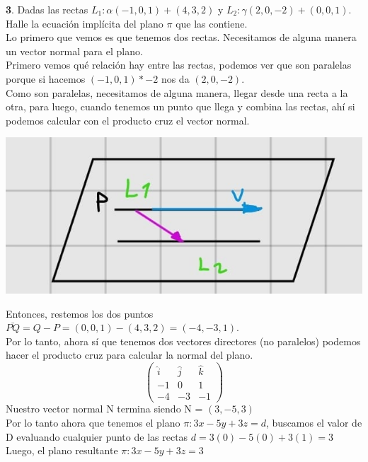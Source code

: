 \documentclass[10pt,a4paper]{article}
\begin{document}
\textbf{3}. Dadas las rectas $L_{1}:\alpha(-1, 0, 1) + (4, 3, 2)$ y $L_{2}:\gamma(2, 0, -2) + (0, 0, 1)$. Halle la ecuación implícita del plano $\pi$ que las contiene. \\
Lo primero que vemos es que tenemos dos rectas. Necesitamos de alguna manera un vector normal para el plano. \\
Primero vemos qué relación hay entre las rectas, podemos ver que son paralelas porque si hacemos $(-1, 0, 1) * -2$ nos da $(2, 0, -2)$. \\
Como son paralelas, necesitamos de alguna manera, llegar desde una recta a la otra, para luego, cuando tenemos un punto que llega y combina las rectas, ahí si podemos calcular con el producto cruz el vector normal. \\
\begin{center}
    \begin{minipage}[b]{0.6\textwidth}
        \includegraphics[width=\linewidth]{assets/rectas_paralelas_plano.jpg}
        \centering
        \label{fig:rectas_paralelas_plano}
    \end{minipage}
\end{center}
Entonces, restemos los dos puntos $\bar{PQ}=Q-P=(0, 0,1)-(4,3,2) = (-4, -3, 1)$. \\
Por lo tanto, ahora sí que tenemos dos vectores directores (no paralelos) podemos hacer el producto cruz para calcular la normal del plano.
\[
\begin{pmatrix}
\hat{i} & \hat{j} & \hat{k} \\
-1 & 0 & 1\\
-4 & -3 & -1
\end{pmatrix}
\]
Nuestro vector normal N termina siendo N = $(3, -5, 3)$ \\
Por lo tanto ahora que tenemos el plano $\pi:3x-5y+3z=d$, buscamos el valor de D evaluando cualquier punto de las rectas $d=3(0)-5(0)+3(1)=3$ \\
Luego, el plano resultante $\pi:3x-5y+3z=3$
\end{document}
